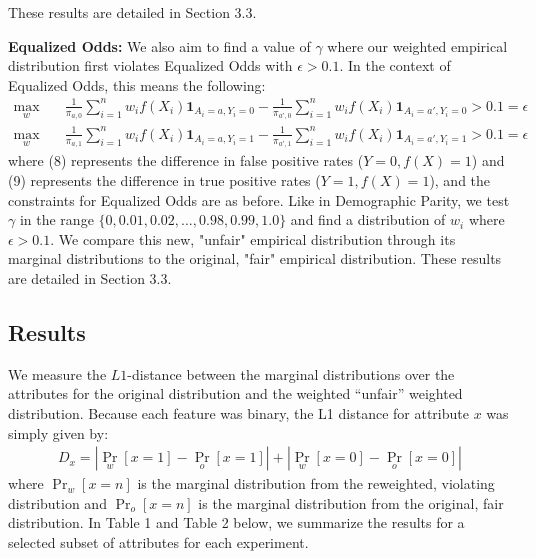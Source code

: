\documentclass[11pt]{article}
\newcommand{\abs}[1]{\left|#1\right|}
\newcommand{\eye}{\mathbf{1}}
\begin{document}
These results are detailed in Section 3.3.
\par
\textbf{Equalized Odds:} We also aim to find a value of $\gamma$ where our weighted empirical distribution first violates Equalized Odds with $\epsilon > 0.1.$ In the context of Equalized Odds, this means the following:
\begin{align}
    \max_w \quad & \frac{1}{\pi_{a,0}} \sum_{i=1}^n w_i f(X_i)\eye_{A_i = a, Y_i = 0} - \frac{1}{\pi_{a',0}} \sum_{i=1}^n w_i f(X_i)\eye_{A_i = a',Y_i = 0} > 0.1 = \epsilon \\ 
    \max_w \quad & \frac{1}{\pi_{a,1}} \sum_{i=1}^n w_i f(X_i)\eye_{A_i = a, Y_i = 1} - \frac{1}{\pi_{a',1}} \sum_{i=1}^n w_i f(X_i)\eye_{A_i = a',Y_i = 1} > 0.1 = \epsilon
\end{align}
where (8) represents the difference in false positive rates ($Y = 0, f(X) = 1$) and (9) represents the difference in true positive rates ($Y = 1, f(X) = 1$), and the constraints for Equalized Odds are as before. Like in Demographic Parity, we test $\gamma$ in the range $\{0, 0.01, 0.02, ..., 0.98, 0.99, 1.0\}$ and find a distribution of $w_i$ where $\epsilon > 0.1.$ We compare this new, "unfair" empirical distribution through its marginal distributions to the original, "fair" empirical distribution. These results are detailed in Section 3.3.

\subsection{Results}
We measure the $L1$-distance between the marginal distributions over the attributes for the original distribution and the weighted ``unfair'' weighted distribution.
Because each feature was binary, the L1 distance for attribute $x$ was simply given by:
\begin{align}
    D_x = \abs{\Pr_w[x = 1] - \Pr_o[x = 1]} + \abs{\Pr_w[x = 0] - \Pr_o[x = 0]}
\end{align}
where $\Pr_w[x = n]$ is the marginal distribution from the reweighted, violating distribution and $\Pr_o[x = n]$ is the marginal distribution from the original, fair distribution. In Table 1 and Table 2 below, we summarize the results for a selected subset of attributes for each experiment. 
\end{document}
